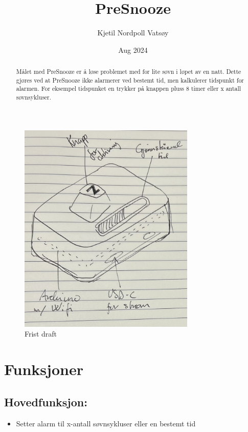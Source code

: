 \documentclass[12pt, a4paper]{article}
\begin{document}
\title{PreSnooze} 
\author{Kjetil Nordpoll Vatsøy}
\date{Aug 2024}

\maketitle

\pagebreak

\begin{figure}[h]
\centering
\includegraphics[width=0.75\textwidth]{IMG_2505.png}
\caption{Frist draft}
\end{figure}   

\begin{abstract}
Målet med PreSnooze er å løse problemet med for lite søvn i løpet av en natt. 
Dette gjøres ved at PreSnooze ikke alarmerer ved bestemt tid, men kalkulerer tidspunkt for alarmen. For eksempel tidspunket en trykker på knappen pluss 8 timer eller x antall søvnsykluser.
\end{abstract}

\pagebreak





\section*{Funksjoner}

\subsection {Hovedfunksjon:}
\begin{itemize}
    \item Setter alarm til x-antall søvnsykluser eller en bestemt tid
\end{itemize}
\end{document}
